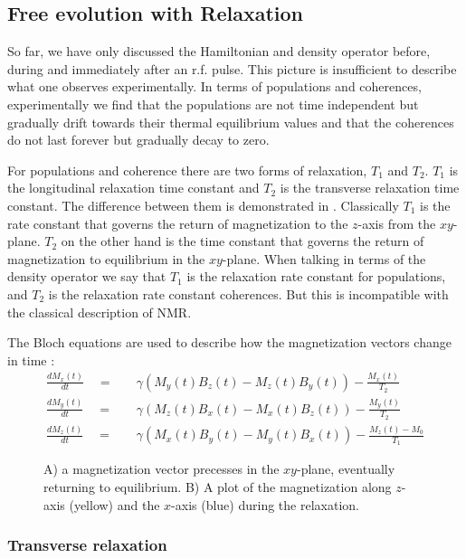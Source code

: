 \subsection{Free evolution with Relaxation}

So far, we have only discussed the Hamiltonian and density operator before, during and
immediately after an r.f. pulse. This picture is insufficient to describe what one observes
experimentally. In terms of populations and coherences, experimentally we find that
the populations are not time independent but gradually drift towards their thermal
equilibrium values and that the coherences do not last forever but gradually decay
to zero.

For populations and coherence there are two forms of relaxation, $T_1$ and $T_2$. $T_1$ is the longitudinal relaxation time
constant and $T_2$ is the transverse relaxation time constant. The difference between them is demonstrated in . Classically
$T_1$ is the rate constant that governs the return of magnetization to the $z$-axis from the $xy$-plane. $T_2$ on
the other hand is the time constant that governs the return of magnetization to equilibrium in the $xy$-plane.
When talking in terms of the density operator we say that $T_1$ is the relaxation rate constant for populations, and $T_2$ is the relaxation
rate constant coherences. But this is incompatible with the classical description of NMR.

The Bloch equations are used to describe how the magnetization vectors change in time \citep{Bloch:1946hk}:
\begin{align}
  \frac{dM_x(t)}{dt}\quad=&\quad\gamma(M_y(t)B_z(t)-M_z(t)B_y(t)) - \frac{M_x(t)}{T_2}\\
  \frac{dM_y(t)}{dt}\quad=&\quad\gamma(M_z(t)B_x(t)-M_x(t)B_z(t)) - \frac{M_y(t)}{T_2}\\
  \frac{dM_z(t)}{dt}\quad=&\quad\gamma(M_x(t)B_y(t)-M_y(t)B_x(t)) - \frac{M_z(t)-M_0}{T_1}
\end{align}

\begin{figure}[h]
  \caption{A) a magnetization vector precesses in the $xy$-plane, eventually returning to equilibrium.
  B) A plot of the magnetization along $z$-axis (yellow) and the $x$-axis (blue) during the relaxation.}
  \label{fig:t1t2}
\end{figure}

\subsubsection{Transverse relaxation}\label{T2}

